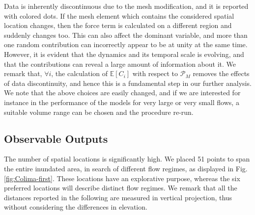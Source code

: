 \documentclass{article}
\begin{document}
Data is inherently discontinuous due to the mesh modification, and it is reported with colored dots. If the mesh element which contains the considered spatial location changes, then the force term is calculated on a different region and suddenly changes too. This can also affect the dominant variable, and more than one random contribution can incorrectly appear to be at unity at the same time. However, it is evident that the dynamics and its temporal scale is evolving, and that the contributions can reveal a large amount of information about it. We remark that, $\forall i$, the calculation of $\mathbb E[C_i]$ with respect to $\mathcal P_M$ removes the effects of data discontinuity, and hence this is a fundamental step in our further analysis. We note that the above choices are easily changed, and if we are interested for instance in the performance of the models for very large or very small flows, a suitable volume range can be chosen and the procedure re-run.

\subsection{Observable Outputs}
The number of spatial locations is significantly high. We placed 51 points to span the entire inundated area, in search of different flow regimes, as displayed in Fig. \ref{fig:Colima-first}. These locations have an explorative purpose, whereas the six preferred locations will describe distinct flow regimes. We remark that all the distances reported in the following are measured in vertical projection, thus without considering the differences in elevation.
\end{document}
